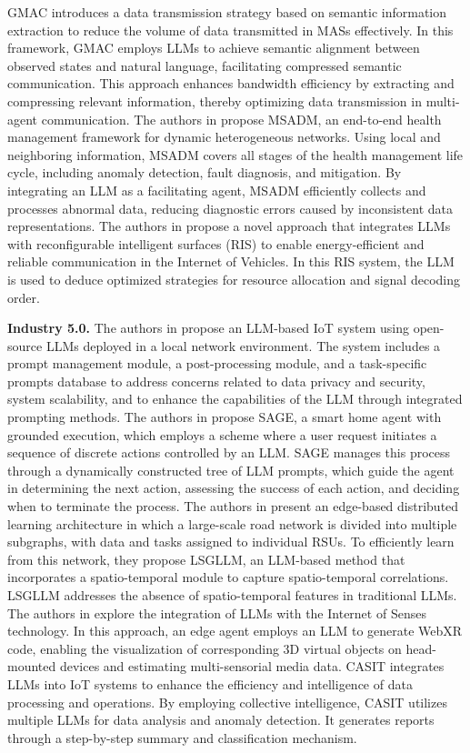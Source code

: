 \documentclass[acmsmall,nonacm]{acmart}
\begin{document}
    GMAC \cite{10720863} introduces a data transmission strategy based on semantic information extraction to reduce the volume of data transmitted in MASs effectively. In this framework, GMAC employs LLMs to achieve semantic alignment between observed states and natural language, facilitating compressed semantic communication. This approach enhances bandwidth efficiency by extracting and compressing relevant information, thereby optimizing data transmission in multi-agent communication.
    The authors in \cite{tang2024largelanguagemodelllmassisted} propose MSADM, an end-to-end health management framework for dynamic heterogeneous networks. Using local and neighboring information, MSADM covers all stages of the health management life cycle, including anomaly detection, fault diagnosis, and mitigation. By integrating an LLM as a facilitating agent, MSADM efficiently collects and processes abnormal data, reducing diagnostic errors caused by inconsistent data representations.
    The authors in \cite{10520918} propose a novel approach that integrates LLMs with reconfigurable intelligent surfaces (RIS) to enable energy-efficient and reliable communication in the Internet of Vehicles. In this RIS system, the LLM is used to deduce optimized strategies for resource allocation and signal decoding order.
    
    \textbf{Industry 5.0.}
    The authors in \cite{Xiao_2024} propose an LLM-based IoT system using open-source LLMs deployed in a local network environment. The system includes a prompt management module, a post-processing module, and a task-specific prompts database to address concerns related to data privacy and security, system scalability, and to enhance the capabilities of the LLM through integrated prompting methods.
    The authors in \cite{10729865} propose SAGE, a smart home agent with grounded execution, which employs a scheme where a user request initiates a sequence of discrete actions controlled by an LLM. SAGE manages this process through a dynamically constructed tree of LLM prompts, which guide the agent in determining the next action, assessing the success of each action, and deciding when to terminate the process.
    The authors in \cite{10742575} present an edge-based distributed learning architecture in which a large-scale road network is divided into multiple subgraphs, with data and tasks assigned to individual RSUs. To efficiently learn from this network, they propose LSGLLM, an LLM-based method that incorporates a spatio-temporal module to capture spatio-temporal correlations. LSGLLM addresses the absence of spatio-temporal features in traditional LLMs.
    The authors in \cite{10731639} explore the integration of LLMs with the Internet of Senses technology. In this approach, an edge agent employs an LLM to generate WebXR code, enabling the visualization of corresponding 3D virtual objects on head-mounted devices and estimating multi-sensorial media data.    
    CASIT \cite{10439991} integrates LLMs into IoT systems to enhance the efficiency and intelligence of data processing and operations. By employing collective intelligence, CASIT utilizes multiple LLMs for data analysis and anomaly detection. It generates reports through a step-by-step summary and classification mechanism.
    
\end{document}
